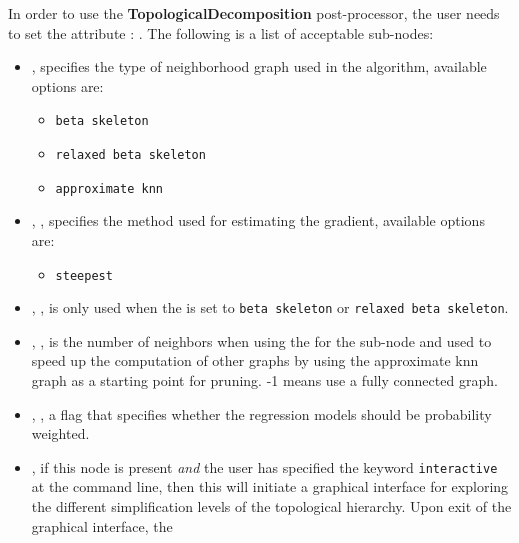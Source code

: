 In order to use the \textbf{TopologicalDecomposition} post-processor, the user
needs to set the attribute :
.
The following is a list of acceptable sub-nodes:
\begin{itemize}
  \item {} , specifies the type
  of neighborhood graph used in the algorithm, available options are:
  \begin{itemize}
    \item \texttt{beta skeleton}
    \item \texttt{relaxed beta skeleton}
    \item \texttt{approximate knn}
  \end{itemize}
  \item {}, , specifies the
  method used for estimating the gradient, available options are:
  \begin{itemize}
    \item \texttt{steepest}
  \end{itemize}
  \item {}, \xmlDesc{float in the range: (0,2], optional field}, is
  only used when the  is set to \texttt{beta skeleton} or
  \texttt{relaxed beta skeleton}.
  \item {}, , is the number of
  neighbors when using the  for the 
  sub-node and used to speed up the computation of other graphs by using the
  approximate knn graph as a starting point for pruning. -1 means use a fully
  connected graph.
  \item {}, , a flag that specifies
  whether the regression models should be probability weighted.
  \item {}, if this node is present \emph{and} the user has
  specified the keyword \texttt{interactive} at the command line, then this will
  initiate a graphical interface for exploring the different simplification
  levels of the topological hierarchy. Upon exit of the graphical interface, the

\end{itemize}
